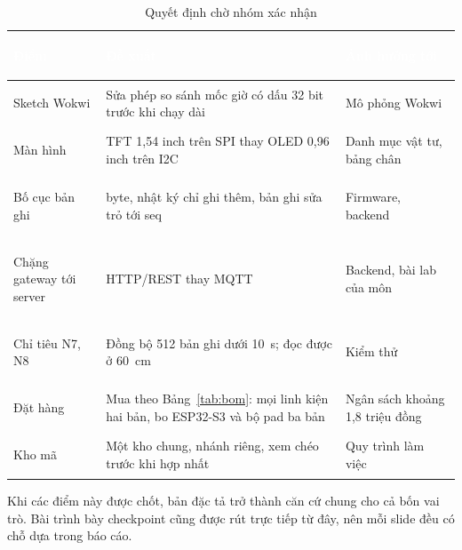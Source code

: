 \begin{table}[H]
    \centering
    \small
    \renewcommand{\arraystretch}{1.35}
    \caption{Quyết định chờ nhóm xác nhận}
    \label{tab:consensus}
    \begin{tabular}{>{\bfseries\raggedright\arraybackslash}m{3.2cm} >{\raggedright\arraybackslash}m{6.6cm} >{\raggedright\arraybackslash}m{4.2cm}}
        \toprule
        \rowcolor{haitayblue}
        \textcolor{white}{Điểm} & \textcolor{white}{Đề xuất} & \textcolor{white}{Ảnh hưởng tới} \\
        \midrule
        \rowcolor{haitayblue!8}
        Sketch Wokwi & Sửa phép so sánh mốc giờ có dấu 32 bit trước khi chạy dài & Mô phỏng Wokwi \\
        Màn hình & TFT 1,54 inch trên SPI thay OLED 0,96 inch trên I2C & Danh mục vật tư, bảng chân \\
        \rowcolor{haitayblue!8}
        Bố cục bản ghi & 16 byte, nhật ký chỉ ghi thêm, bản ghi sửa trỏ tới seq & Firmware, backend \\
        Chặng gateway tới server & HTTP/REST thay MQTT & Backend, bài lab của môn \\
        \rowcolor{haitayblue!8}
        Chỉ tiêu N7, N8 & Đồng bộ 512 bản ghi dưới 10~s; đọc được ở 60~cm & Kiểm thử \\
        Đặt hàng & Mua theo Bảng~\ref{tab:bom}: mọi linh kiện hai bản, bo ESP32-S3 và bộ pad ba bản & Ngân sách khoảng 1,8 triệu đồng \\
        \rowcolor{haitayblue!8}
        Kho mã & Một kho chung, nhánh riêng, xem chéo trước khi hợp nhất & Quy trình làm việc \\
        \bottomrule
    \end{tabular}
\end{table}

Khi các điểm này được chốt, bản đặc tả trở thành căn cứ chung cho cả bốn vai trò. Bài trình bày checkpoint cũng được rút trực tiếp từ đây, nên mỗi slide đều có chỗ dựa trong báo cáo.
